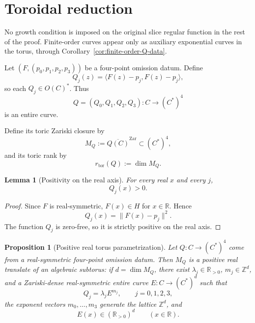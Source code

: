 \documentclass[11pt]{amsart}
\def\HH{H}%
\def\CC{C}%
\def\OO{O}%
\numberwithin{equation}{section}
\newtheorem{proposition}[theorem]{Proposition}
\newtheorem{lemma}[theorem]{Lemma}
\theoremstyle{definition}
\theoremstyle{remark}
\newcommand{\HH}{\mathbb H}
\newcommand{\CC}{\mathbb C}
\newcommand{\RR}{\mathbb R}
\newcommand{\ZZ}{\mathbb Z}
\newcommand{\OO}{\mathcal O}
\newcommand{\Zar}{\mathrm{Zar}}
\newcommand{\rtor}{r_{\mathrm{tor}}}
\begin{document}
\section{Toroidal reduction}
\label{sec:toroidal}

No growth condition is imposed on the original slice regular function in the rest of the proof.  Finite-order curves appear only as auxiliary exponential curves in the torus, through Corollary~\ref{cor:finite-order-Q-data}.

Let $(F,(p_0,p_1,p_2,p_3))$ be a four-point omission datum. Define
\[
Q_j(z)=\langle F(z)-p_j,F(z)-p_j\rangle,
\]
so each $Q_j\in\OO(\CC)^*$. Thus
\[
Q=(Q_0,Q_1,Q_2,Q_3):\CC\to(\CC^*)^4
\]
is an entire curve.

Define its toric Zariski closure by
\[
M_Q:=\overline{Q(\CC)}^{\Zar}\subset(\CC^*)^4,
\]
and its toric rank by
\[
\rtor(Q):=\dim M_Q.
\]

\begin{lemma}[Positivity on the real axis]\label{lem:positive-real-axis}
For every real $x$ and every $j$,
\[
Q_j(x)>0.
\]
\end{lemma}

\begin{proof}
Since $F$ is real-symmetric, $F(x)\in\HH$ for $x\in\RR$. Hence
\[
Q_j(x)=\|F(x)-p_j\|^2.
\]
The function $Q_j$ is zero-free, so it is strictly positive on the real axis.
\end{proof}

\begin{proposition}[Positive real torus parametrization]\label{prop:positive-torus}
Let $Q:\CC\to(\CC^*)^4$ come from a real-symmetric four-point omission datum.  Then $M_Q$ is a positive real translate of an algebraic subtorus: if $d=\dim M_Q$, there exist $\lambda_j\in\RR_{>0}$, $m_j\in\ZZ^d$, and a Zariski-dense real-symmetric entire curve $E:\CC\to(\CC^*)^d$ such that
\[
Q_j=\lambda_jE^{m_j},\qquad j=0,1,2,3,
\]
the exponent vectors $m_0,\ldots,m_3$ generate the lattice $\ZZ^d$, and
\[
E(x)\in(\RR_{>0})^d\qquad (x\in\RR).
\]
\end{proposition}
\end{document}
